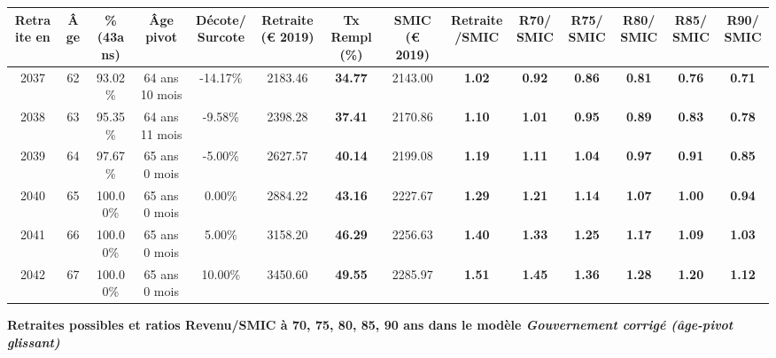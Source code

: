 \begin{adjustbox}{max width=\textwidth} 
\begin{tabular}[htb]{|c|c||c|c|c||c|c||c|c||c|c|c|c|c|} 
\hline 
 Retraite en &  Âge &  \%(43ans) &  Âge pivot &  Décote/Surcote &  Retraite (\euro{} 2019) &  Tx Rempl(\%) &  SMIC (\euro{} 2019) &  Retraite/SMIC &  R70/SMIC &  R75/SMIC &  R80/SMIC &  R85/SMIC &  R90/SMIC \\ 
\hline \hline 
 2037 &  62 &  93.02\% &  64 ans 10 mois &  -14.17\% &  2183.46 &  {\bf 34.77} &  2143.00 &  {\bf 1.02} &  {\bf {\color{red} 0.92}} &  {\bf {\color{red} 0.86}} &  {\bf {\color{red} 0.81}} &  {\bf {\color{red} 0.76}} &  {\bf {\color{red} 0.71}} \\ 
\hline 
 2038 &  63 &  95.35\% &  64 ans 11 mois &  -9.58\% &  2398.28 &  {\bf 37.41} &  2170.86 &  {\bf 1.10} &  {\bf 1.01} &  {\bf {\color{red} 0.95}} &  {\bf {\color{red} 0.89}} &  {\bf {\color{red} 0.83}} &  {\bf {\color{red} 0.78}} \\ 
\hline 
 2039 &  64 &  97.67\% &  65 ans 0 mois &  -5.00\% &  2627.57 &  {\bf 40.14} &  2199.08 &  {\bf 1.19} &  {\bf 1.11} &  {\bf 1.04} &  {\bf {\color{red} 0.97}} &  {\bf {\color{red} 0.91}} &  {\bf {\color{red} 0.85}} \\ 
\hline 
 2040 &  65 &  100.00\% &  65 ans 0 mois &  0.00\% &  2884.22 &  {\bf 43.16} &  2227.67 &  {\bf 1.29} &  {\bf 1.21} &  {\bf 1.14} &  {\bf 1.07} &  {\bf {\color{red} 1.00}} &  {\bf {\color{red} 0.94}} \\ 
\hline 
 2041 &  66 &  100.00\% &  65 ans 0 mois &  5.00\% &  3158.20 &  {\bf 46.29} &  2256.63 &  {\bf 1.40} &  {\bf 1.33} &  {\bf 1.25} &  {\bf 1.17} &  {\bf 1.09} &  {\bf 1.03} \\ 
\hline 
 2042 &  67 &  100.00\% &  65 ans 0 mois &  10.00\% &  3450.60 &  {\bf 49.55} &  2285.97 &  {\bf 1.51} &  {\bf 1.45} &  {\bf 1.36} &  {\bf 1.28} &  {\bf 1.20} &  {\bf 1.12} \\ 
\hline 
\hline 
\end{tabular} 
\end{adjustbox} 
 
 \vspace{0.1cm} 
{\bf \noindent Retraites possibles et ratios Revenu/SMIC à 70, 75, 80, 85, 90 ans dans le modèle \emph{Gouvernement corrigé (âge-pivot glissant)}}  
 
